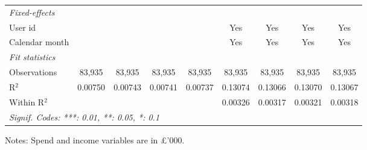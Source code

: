 \begin{table}[htbp]
\begin{threeparttable}[b]
\begin{tabular}{lcccccccc}
         \midrule
         \emph{Fixed-effects}\\
         User id                     &                    &                    &                    &                    & Yes                & Yes                & Yes                & Yes\\  
         Calendar month              &                    &                    &                    &                    & Yes                & Yes                & Yes                & Yes\\  
         \midrule
         \emph{Fit statistics}\\
         Observations                & 83,935             & 83,935             & 83,935             & 83,935             & 83,935             & 83,935             & 83,935             & 83,935\\  
         R$^2$                       & 0.00750            & 0.00743            & 0.00741            & 0.00737            & 0.13074            & 0.13066            & 0.13070            & 0.13067\\  
         Within R$^2$                &                    &                    &                    &                    & 0.00326            & 0.00317            & 0.00321            & 0.00318\\  
         \midrule \midrule
         \multicolumn{9}{l}{\emph{Signif. Codes: ***: 0.01, **: 0.05, *: 0.1}}\\
      \end{tabular}
      
      \begin{tablenotes}\footnotesize
         \item Notes: Spend and income variables are in \pounds'000.
      \end{tablenotes}
   \end{threeparttable}
\end{table}


